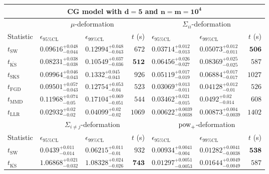 \begin{tabular}{l|llr|llr}
	\toprule
	\multicolumn{7}{c}{{\bf CG model with $\mathbf{d=5}$ and $\mathbf{n=m=10^{4}}$}} \\
	\toprule
	\multicolumn{1}{c}{} & \multicolumn{3}{c}{$\mu$-deformation} & \multicolumn{3}{c}{$\Sigma_{ii}$-deformation} \\
	Statistic & $\epsilon_{95\%\mathrm{CL}}$ & $\epsilon_{99\%\mathrm{CL}}$ & $t$ (s) & $\epsilon_{95\%\mathrm{CL}}$ & $\epsilon_{99\%\mathrm{CL}}$ & $t$ (s) \\
	\midrule
	$t_{\mathrm{SW}}$ & $0.09616_{-0.044}^{+0.048}$ & $0.12994_{-0.043}^{+0.048}$ & $672$ & $0.03714_{-0.013}^{+0.012}$ & $0.05073_{-0.011}^{+0.012}$ & ${\mathbf{506}}$ \\
	$t_{\overline{\mathrm{KS}}}$ & ${\mathbf{0.08231_{-0.038}^{+0.038}}}$ & ${\mathbf{0.10549_{-0.036}^{+0.037}}}$ & ${\mathbf{512}}$ & $0.06456_{-0.027}^{+0.026}$ & $0.08369_{-0.025}^{+0.025}$ & $587$ \\
	$t_{\mathrm{SKS}}$ & $0.09964_{-0.043}^{+0.046}$ & $0.1332_{-0.043}^{+0.045}$ & $926$ & $0.05119_{-0.019}^{+0.017}$ & $0.06884_{-0.017}^{+0.017}$ & $1027$ \\
	$t_{\mathrm{FGD}}$ & $0.09501_{-0.043}^{+0.057}$ & $0.12754_{-0.04}^{+0.053}$ & $523$ & ${\mathbf{0.03069_{-0.011}^{+0.013}}}$ & ${\mathbf{0.04128_{-0.01}^{+0.012}}}$ & $526$ \\
	$t_{\mathrm{MMD}}$ & $0.11968_{-0.05}^{+0.074}$ & $0.17104_{-0.051}^{+0.069}$ & $544$ & $0.03462_{-0.015}^{+0.021}$ & $0.0492_{-0.014}^{+0.02}$ & $608$ \\
	$t_{\mathrm{LLR}}$ & $0.02932_{-0.02}^{+0.02}$ & $0.04099_{-0.02}^{+0.02}$ & $1069$ & $0.00622_{-0.0038}^{+0.0039}$ & $0.00873_{-0.0039}^{+0.004}$ & $1402$ \\
	\toprule
	\multicolumn{1}{c}{} & \multicolumn{3}{c}{$\Sigma_{i\neq j}$-deformation} & \multicolumn{3}{c}{$\rm{pow}_{+}$-deformation} \\
	Statistic & $\epsilon_{95\%\mathrm{CL}}$ & $\epsilon_{99\%\mathrm{CL}}$ & $t$ (s) & $\epsilon_{95\%\mathrm{CL}}$ & $\epsilon_{99\%\mathrm{CL}}$ & $t$ (s) \\
	\midrule
	$t_{\mathrm{SW}}$ & $0.0439_{-0.014}^{+0.011}$ & $0.06215_{-0.01}^{+0.011}$ & $932$ & $0.00934_{-0.004}^{+0.0041}$ & $0.01282_{-0.0038}^{+0.0041}$ & ${\mathbf{538}}$ \\
	$t_{\overline{\mathrm{KS}}}$ & $1.06868_{-0.032}^{+0.021}$ & $1.08328_{-0.026}^{+0.024}$ & ${\mathbf{743}}$ & $0.01297_{-0.0053}^{+0.0051}$ & $0.01644_{-0.0049}^{+0.0049}$ & $587$ \\

\end{tabular}
